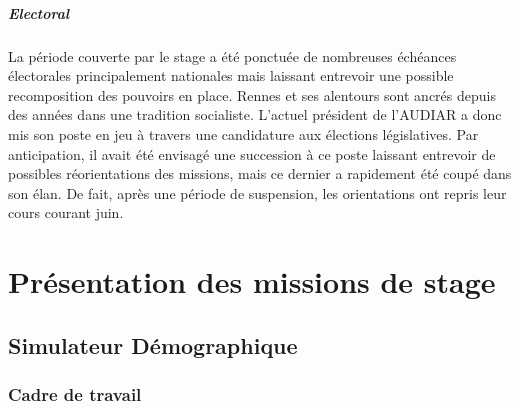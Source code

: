 \documentclass{bredele}
\begin{document}
\subsubsection{Electoral}
La période couverte par le stage a été ponctuée de nombreuses échéances électorales principalement nationales mais laissant entrevoir une possible recomposition des pouvoirs en place. Rennes et ses alentours sont ancrés depuis des années dans une tradition socialiste. L’actuel président de l’AUDIAR a donc mis son poste en jeu à travers une candidature aux élections législatives. Par anticipation, il avait été envisagé une succession à ce poste laissant entrevoir de possibles réorientations des missions, mais ce dernier a rapidement été coupé dans son élan. De fait, après une période de suspension, les orientations ont repris leur cours courant juin.
\clearemptydoublepage
\part[Missions de stage]{Présentation des missions de stage}
\chapter[Simulateur Démographique]{Simulateur Démographique}
\section{Cadre de travail}
\end{document}
